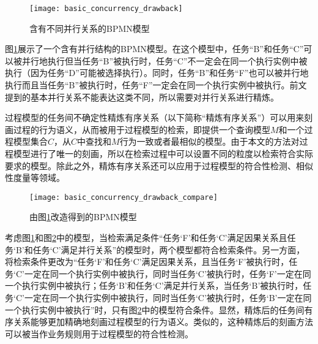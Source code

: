 \begin{figure}[htbp]
  \centering
  \texttt{[image: basic\_concurrency\_drawback]}
  \caption{含有不同并行关系的BPMN模型}
  \label{fig:basic_concurrency_drawback}
\end{figure}

\begin{example}\label{ex:basic_concurrency_drawback}
图\ref{fig:basic_concurrency_drawback}展示了一个含有并行结构的BPMN模型。在这个模型中，任务“B”和任务“C”可以被并行地执行但当任务“B”被执行时，任务“C”不一定会在同一个执行实例中被执行（因为任务“D”可能被选择执行）。同时，任务“B”和任务“F”也可以被并行地执行而且当任务“B”被执行时，任务“F”一定会在同一个执行实例中被执行。前文提到的基本并行关系不能表达这类不同，所以需要对并行关系进行精炼。
\end{example}

过程模型的任务间不确定性精炼有序关系（以下简称“精炼有序关系”）可以用来刻画过程的行为语义，从而被用于过程模型的检索，即提供一个查询模型$M$和一个过程模型集合$C$，从$C$中查找和$M$行为一致或者最相似的模型。由于本文的方法对过程模型进行了唯一的刻画，所以在检索过程中可以设置不同的粒度以检索符合实际要求的模型。除此之外，精炼有序关系还可以应用于过程模型的符合性检测、相似性度量等领域。

\begin{figure}[htbp]
  \centering
  \texttt{[image: basic\_concurrency\_drawback\_compare]}
  \caption{由图\ref{fig:basic_concurrency_drawback}改造得到的BPMN模型\label{fig:basic_concurrency_drawback_compare}}
\end{figure}

\begin{example}\label{ex:basic_concurrency_drawback_compare}
考虑图\ref{fig:basic_concurrency_drawback}和图\ref{fig:basic_concurrency_drawback_compare}中的模型，当检索满足条件“任务`F'和任务`C'满足因果关系且任务`B'和任务`C'满足并行关系”的模型时，两个模型都符合检索条件。另一方面，将检索条件更改为“任务`F'和任务`C'满足因果关系，且当任务`F'被执行时，任务`C'一定在同一个执行实例中被执行，同时当任务`C'被执行时，任务`F'一定在同一个执行实例中被执行；任务`B'和任务`C'满足并行关系，当任务`B'被执行时，任务`C'一定在同一个执行实例中被执行，同时当任务`C'被执行时，任务`B'一定在同一个执行实例中被执行”时，只有图\ref{fig:basic_concurrency_drawback_compare}中的模型符合条件。显然，精炼后的任务间有序关系能够更加精确地刻画过程模型的行为语义。类似的，这种精炼后的刻画方法可以被当作业务规则用于过程模型的符合性检测。
\end{example}

